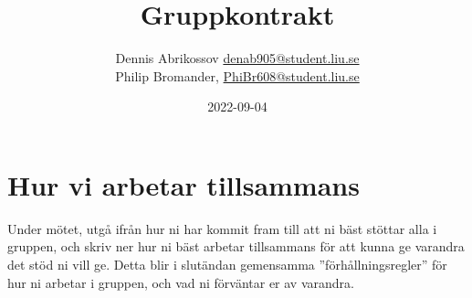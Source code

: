 \documentclass{mall}
\author{Dennis Abrikossov \url{denab905@student.liu.se}\\
Philip Bromander, \url{PhiBr608@student.liu.se}}
\title{Gruppkontrakt}
\date{2022-09-04}
\begin{document}
\projectpage





\section{Hur vi arbetar tillsammans}


Under mötet, utgå ifrån hur ni har kommit fram till att ni bäst stöttar alla i gruppen, och skriv ner hur ni bäst arbetar tillsammans för att kunna ge varandra det stöd ni
vill ge. Detta blir i slutändan gemensamma ''förhållningsregler'' för hur ni arbetar i gruppen, och
vad ni förväntar er av varandra.
\end{document}
